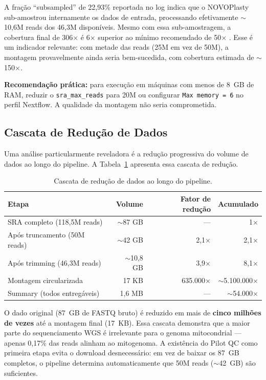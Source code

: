 A fração ``subsampled'' de 22,93\% reportada no log indica que o NOVOPlasty sub-amostrou internamente os dados de entrada, processando efetivamente $\sim$10,6M reads dos 46,3M disponíveis. Mesmo com essa sub-amostragem, a cobertura final de 306$\times$ é 6$\times$ superior ao mínimo recomendado de 50$\times$ \cite{dierckxsens2017}. Esse é um indicador relevante: com metade das reads (25M em vez de 50M), a montagem provavelmente ainda seria bem-sucedida, com cobertura estimada de $\sim$150$\times$.

\textbf{Recomendação prática:} para execução em máquinas com menos de 8~GB de RAM, reduzir o \texttt{sra\_max\_reads} para 20M ou configurar \texttt{Max memory = 6} no perfil Nextflow. A qualidade da montagem não seria comprometida.

\subsection{Cascata de Redução de Dados}

Uma análise particularmente reveladora é a redução progressiva do volume de dados ao longo do pipeline. A Tabela~\ref{tab:cascata} apresenta essa cascata de redução.

\begin{table}[H]
\centering
\caption{Cascata de redução de dados ao longo do pipeline.}
\label{tab:cascata}
\begin{tabular}{@{}lrrr@{}}
\toprule
\textbf{Etapa} & \textbf{Volume} & \textbf{Fator de redução} & \textbf{Acumulado} \\
\midrule
SRA completo (118,5M reads) & $\sim$87 GB & --- & 1$\times$ \\
Após truncamento (50M reads) & $\sim$42 GB & 2,1$\times$ & 2,1$\times$ \\
Após trimming (46,3M reads) & $\sim$10,8 GB & 3,9$\times$ & 8,1$\times$ \\
Montagem circularizada & 17 KB & 635.000$\times$ & $\sim$5.100.000$\times$ \\
Summary (todos entregáveis) & 1,6 MB & --- & $\sim$54.000$\times$ \\
\bottomrule
\end{tabular}
\end{table}

O dado original (87~GB de FASTQ bruto) é reduzido em mais de \textbf{cinco milhões de vezes} até a montagem final (17~KB). Essa cascata demonstra que a maior parte do sequenciamento WGS é irrelevante para o genoma mitocondrial --- apenas 0,17\% das reads alinham ao mitogenoma. A existência do Pilot QC como primeira etapa evita o download desnecessário: em vez de baixar os 87~GB completos, o pipeline determina automaticamente que 50M reads ($\sim$42~GB) são suficientes.

